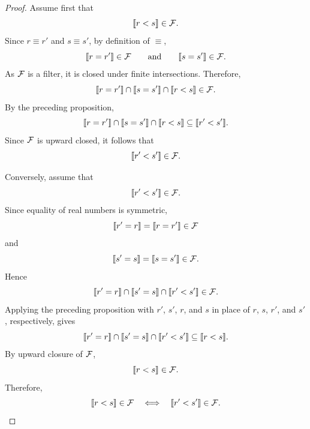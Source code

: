 \begin{proof}
    Assume first that
    \[
    \llbracket r<s\rrbracket\in\mathcal{F}.
    \]
    Since \(r\equiv r'\) and \(s\equiv s'\), by definition of \(\equiv\),
    \[
    \llbracket r=r'\rrbracket\in\mathcal{F}
    \qquad\text{and}\qquad
    \llbracket s=s'\rrbracket\in\mathcal{F}.
    \]
    As \(\mathcal{F}\) is a filter, it is closed under finite intersections.
    Therefore,
    \[
    \llbracket r=r'\rrbracket
    \cap
    \llbracket s=s'\rrbracket
    \cap
    \llbracket r<s\rrbracket
    \in\mathcal{F}.
    \]
    By the preceding proposition,
    \[
    \llbracket r=r'\rrbracket
    \cap
    \llbracket s=s'\rrbracket
    \cap
    \llbracket r<s\rrbracket
    \subseteq
    \llbracket r'<s'\rrbracket.
    \]
    Since \(\mathcal{F}\) is upward closed, it follows that
    \[
    \llbracket r'<s'\rrbracket\in\mathcal{F}.
    \]

    Conversely, assume that
    \[
    \llbracket r'<s'\rrbracket\in\mathcal{F}.
    \]
    Since equality of real numbers is symmetric,
    \[
    \llbracket r'=r\rrbracket=\llbracket r=r'\rrbracket\in\mathcal{F}
    \]
    and
    \[
    \llbracket s'=s\rrbracket=\llbracket s=s'\rrbracket\in\mathcal{F}.
    \]
    Hence
    \[
    \llbracket r'=r\rrbracket
    \cap
    \llbracket s'=s\rrbracket
    \cap
    \llbracket r'<s'\rrbracket
    \in\mathcal{F}.
    \]
    Applying the preceding proposition with \(r'\), \(s'\), \(r\), and
    \(s\) in place of \(r\), \(s\), \(r'\), and \(s'\), respectively, gives
    \[
    \llbracket r'=r\rrbracket
    \cap
    \llbracket s'=s\rrbracket
    \cap
    \llbracket r'<s'\rrbracket
    \subseteq
    \llbracket r<s\rrbracket.
    \]
    By upward closure of \(\mathcal{F}\),
    \[
    \llbracket r<s\rrbracket\in\mathcal{F}.
    \]
    Therefore,
    \[
    \llbracket r<s\rrbracket\in\mathcal{F}
    \quad\Longleftrightarrow\quad
    \llbracket r'<s'\rrbracket\in\mathcal{F}.
    \]
\end{proof}

